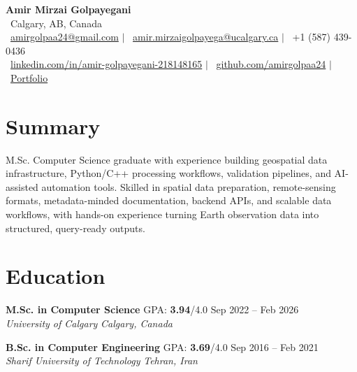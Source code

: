 \documentclass[a4paper,10pt]{article}
\newcommand{\resumeEducationSubheading}[5]{
    \textbf{#1} \hfill #2 \hfill #3 \\
    \textit{#4} \hfill \textit{#5}
}
\begin{document}

\begin{center}
    {\LARGE \textbf{Amir Mirzai Golpayegani}} \\[0.25em]
    \faMapMarker*~Calgary, AB, Canada \\[0.25em]
    \faEnvelope~\href{mailto:amirgolpaa24@gmail.com}{amirgolpaa24@gmail.com}
    $|$
    \faEnvelope~\href{mailto:amir.mirzaigolpayega@ucalgary.ca}{amir.mirzaigolpayega@ucalgary.ca}
    $|$
    \faPhone*~+1 (587) 439-0436 \\[0.25em]
    \faLinkedin~\href{https://linkedin.com/in/amir-golpayegani-218148165}{linkedin.com/in/amir-golpayegani-218148165}
    $|$
    \faGithub~\href{https://github.com/amirgolpaa24}{github.com/amirgolpaa24}
    $|$
    \faGlobe~\href{https://amir-portfolio-navy.vercel.app/}{Portfolio}
\end{center}


\section*{Summary}

M.Sc. Computer Science graduate with experience building geospatial data infrastructure, Python/C++ processing workflows, validation pipelines, and AI-assisted automation tools. Skilled in spatial data preparation, remote-sensing formats, metadata-minded documentation, backend APIs, and scalable data workflows, with hands-on experience turning Earth observation data into structured, query-ready outputs.


\section*{Education}

\resumeEducationSubheading
{M.Sc. in Computer Science}
{GPA: \textbf{3.94}/4.0}
{Sep 2022 -- Feb 2026}
{University of Calgary}
{Calgary, Canada}

\vspace{0.35em}

\resumeEducationSubheading
{B.Sc. in Computer Engineering}
{GPA: \textbf{3.69}/4.0}
{Sep 2016 -- Feb 2021}
{Sharif University of Technology}
{Tehran, Iran}

\end{document}
